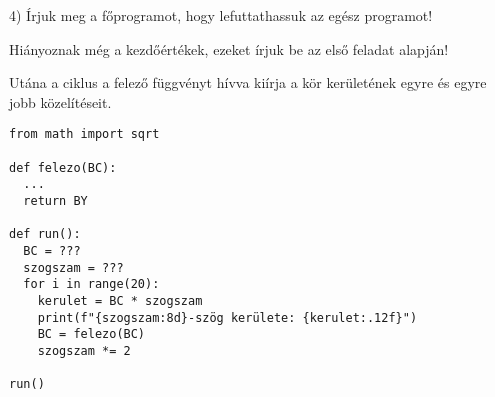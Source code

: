 \documentclass[a4paper,12pt]{article}
\begin{document}
\newpage

4) Írjuk meg a főprogramot, hogy lefuttathassuk az egész programot!

Hiányoznak még a kezdőértékek, ezeket írjuk be az első feladat alapján!

Utána a ciklus a felező függvényt hívva kiírja a kör kerületének egyre
és egyre jobb közelítéseit.

\begin{verbatim}
from math import sqrt

def felezo(BC):
  ...
  return BY

def run():
  BC = ???
  szogszam = ???
  for i in range(20):
    kerulet = BC * szogszam
    print(f"{szogszam:8d}-szög kerülete: {kerulet:.12f}")
    BC = felezo(BC)
    szogszam *= 2

run()
\end{verbatim}
\end{document}
